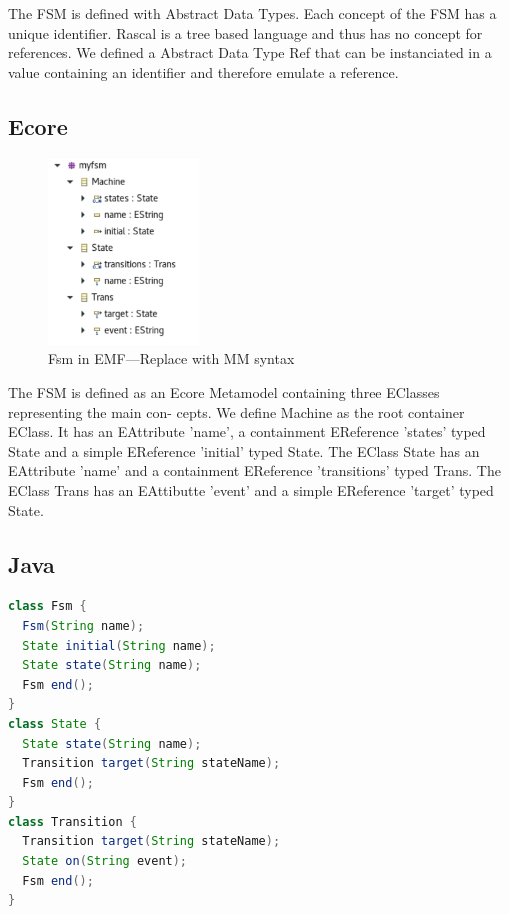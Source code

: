 \documentclass[sigplan]{acmart}
\begin{document}
The FSM is defined with Abstract Data Types.
Each concept of the FSM has a unique identifier.
Rascal is a tree based language and thus has no concept for references.
We defined a Abstract Data Type Ref that can be instanciated in a value containing an identifier and therefore emulate a reference.

\subsection{Ecore}
\begin{figure}
	\includegraphics[width=4cm]{figures/fsm-ecore.pdf}
	\caption{Fsm in EMF---Replace with MM syntax}
	\label{fig:fsmEcore}
\end{figure}

The FSM is defined as an Ecore
Metamodel containing three EClasses representing the main con-
cepts. We define Machine as the root container EClass. It has an
EAttribute ’name’, a containment EReference ’states’ typed State
and a simple EReference ’initial’ typed State. The EClass State has
an EAttribute ’name’ and a containment EReference ’transitions’
typed Trans. The EClass Trans has an EAttibutte ’event’ and a
simple EReference ’target’ typed State.

\subsection{Java}
\begin{minipage}{\columnwidth}
\begin{lstlisting}[label=lst:fsm-api, caption={FSM in Fluent API}, language=Java]
class Fsm {
  Fsm(String name);
  State initial(String name);
  State state(String name);
  Fsm end();
}
class State {
  State state(String name);
  Transition target(String stateName);
  Fsm end();
}
class Transition {
  Transition target(String stateName);
  State on(String event);
  Fsm end();
}
\end{lstlisting}
\end{minipage}
\end{document}
